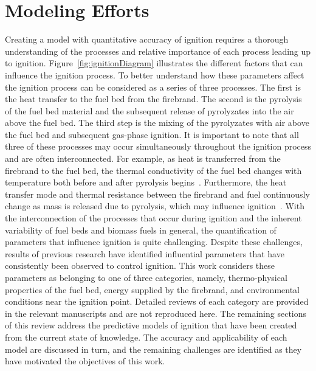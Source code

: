 \section{Modeling Efforts}
    Creating a model with quantitative accuracy of ignition requires a thorough understanding of the processes and relative importance of each process leading up to ignition. Figure~\ref{fig:ignitionDiagram} illustrates the different factors that can influence the ignition process. To better understand how these parameters affect the ignition process can be considered as a series of three processes. The first is the heat transfer to the fuel bed from the firebrand. The second is the pyrolysis of the fuel bed material and the subsequent release of pyrolyzates into the air above the fuel bed. The third step is the mixing of the pyrolyzates with air above the fuel bed and subsequent gas-phase ignition. It is important to note that all three of these processes may occur simultaneously throughout the ignition process and are often interconnected. For example, as heat is transferred from the firebrand to the fuel bed, the thermal conductivity of the fuel bed changes with temperature both before and after pyrolysis begins~\cite{Fjellerup2003}. Furthermore, the heat transfer mode and thermal resistance between the firebrand and fuel continuously change as mass is released due to pyrolysis, which may influence ignition~\cite{Yang2016EffectParticle}. With the interconnection of the processes that occur during ignition and the inherent variability of fuel beds and biomass fuels in general, the quantification of parameters that influence ignition is quite challenging. Despite these challenges, results of previous research have identified influential parameters that have consistently been observed to control ignition. This work considers these parameters as belonging to one of three categories, namely, thermo-physical properties of the fuel bed, energy supplied by the firebrand, and environmental conditions near the ignition point. Detailed reviews of each category are provided in the relevant manuscripts and are not reproduced here. The remaining sections of this review address the predictive models of ignition that have been created from the current state of knowledge. The accuracy and applicability of each model are discussed in turn, and the remaining challenges are identified as they have motivated the objectives of this work. 
